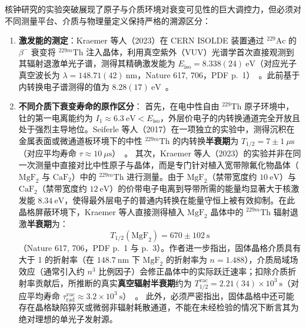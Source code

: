 核钟研究的实验突破展现了原子与介质环境对衰变可见性的巨大调控力，但必须对不同测量平台、介质与物理量定义保持严格的溯源区分：
\begin{enumerate}
\item \textbf{激发能的测定}：Kraemer 等人（2023）在 CERN ISOLDE 装置通过 $^{229}\mathrm{Ac}$ 的 $\beta^-$ 衰变将 $^{229m}\mathrm{Th}$ 注入晶体，利用真空紫外（VUV）光谱学首次直接观测到其辐射退激单光子谱，测得其精确激发能为 $E_{\mathrm{iso}} = 8.338(24)\ \mathrm{eV}$（对应光子真空波长为 $\lambda = 148.71(42)\ \mathrm{nm}$，Nature 617, 706，PDF p.~1）~\cite{kraemer-2023-radiative-decay-229th-isomer}。此前基于内转换电子谱测得的值为 $8.28(17)\ \mathrm{eV}$~\cite{beeks-2021-thorium-229-isomer-nuclear-clock}。
\item \textbf{不同介质下衰变寿命的原作区分}：
首先，在电中性自由 $^{229}\mathrm{Th}$ 原子环境中，钍的第一电离能约为 $I_1 \approx 6.3\ \mathrm{eV} < E_{\mathrm{iso}}$，外层价电子的内转换通道完全开放且处于强烈主导地位。Seiferle 等人（2017）在一项独立的实验中，测得沉积在金属表面或微通道板环境下的中性 $^{229m}\mathrm{Th}$ 的内转换\textbf{半衰期}为 $T_{1/2} = 7 \pm 1\ \mu\mathrm{s}$（对应平均寿命 $\tau \approx 10\ \mu\mathrm{s}$）~\cite{beeks-2021-thorium-229-isomer-nuclear-clock,kraemer-2023-radiative-decay-229th-isomer}。
其次，Kraemer 等人（2023）的实验并非在同一次测量中直接对比中性原子与晶体，而是专门针对植入宽带隙氟化物晶体（$\mathrm{MgF}_2$ 与 $\mathrm{CaF}_2$）中的 $^{229m}\mathrm{Th}$ 进行测量。由于 $\mathrm{MgF}_2$（禁带宽度约 $10\ \mathrm{eV}$）与 $\mathrm{CaF}_2$（禁带宽度约 $12\ \mathrm{eV}$）的价带电子电离到导带所需的能量均显著大于核激发能 $8.34\ \mathrm{eV}$，使得最外层电子的普通内转换在能量守恒上被有效抑制。在此晶格屏蔽环境下，Kraemer 等人直接测得植入 $\mathrm{MgF}_2$ 晶体中的 $^{229m}\mathrm{Th}$ 辐射退激\textbf{半衰期}为：
\begin{equation}\label{eq:4-8-th-rad-lifetime}
T_{1/2}(\mathrm{MgF}_2) = 670 \pm 102\ \mathrm{s}
\end{equation}
（Nature 617, 706，PDF p.~1 与 p.~3）。作者进一步指出，固体晶格介质具有大于 1 的折射率（在 $148.7\ \mathrm{nm}$ 下 $\mathrm{MgF}_2$ 的折射率为 $n = 1.488$），介质局域场效应（通常引入约 $n^3$ 比例因子）会修正晶体中的实际跃迁速率；扣除介质折射率贡献后，所推断的真实\textbf{真空辐射半衰期}约为 $T_{1/2}^{\mathrm{vac}} = 2.21(34) \times 10^3\ \mathrm{s}$（对应平均寿命 $\tau_{\mathrm{rad}}^{\mathrm{vac}} \approx 3.2 \times 10^3\ \mathrm{s}$）~\cite{kraemer-2023-radiative-decay-229th-isomer}。
此外，必须严密指出，固体晶格中还可能存在晶格缺陷猝灭或微弱非辐射耗散通道，不能在未经检验的情况下断言其为绝对理想的单光子发射源。
\end{enumerate}

